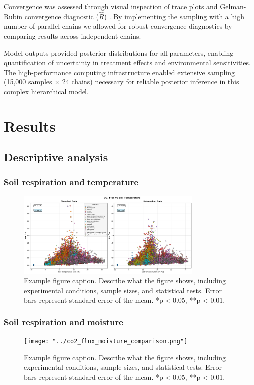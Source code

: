 \documentclass[12pt,a4paper]{article}
\begin{document}
Convergence was assessed through visual inspection of trace plots and Gelman-Rubin convergence diagnostic ($\hat{R}$) \citep{gelman1992inference, vehtari2021rank}. By implementing the sampling with a high number of parallel chains we allowed for robust convergence diagnostics by comparing results across independent chains.

Model outputs provided posterior distributions for all parameters, enabling quantification of uncertainty in treatment effects and environmental sensitivities. The high-performance computing infrastructure enabled extensive sampling (15,000 samples $\times$ 24 chains) necessary for reliable posterior inference in this complex hierarchical model.


\section{Results}

\subsection{Descriptive analysis}

\subsubsection{Soil respiration and temperature}
\begin{figure}[H]
    \centering
    \includegraphics[width=0.8\textwidth]{"../co2_flux_temperature_comparison.png"}
    \caption{Example figure caption. Describe what the figure shows, including experimental conditions, sample sizes, and statistical tests. Error bars represent standard error of the mean. *p < 0.05, **p < 0.01.}
    \label{fig:co2_temp}
\end{figure}

\subsubsection{Soil respiration and moisture}
\begin{figure}[H]
    \centering
    \texttt{[image: "../co2\_flux\_moisture\_comparison.png"]}
    \caption{Example figure caption. Describe what the figure shows, including experimental conditions, sample sizes, and statistical tests. Error bars represent standard error of the mean. *p < 0.05, **p < 0.01.}
    \label{fig:co2_moisture}
\end{figure}
\end{document}
